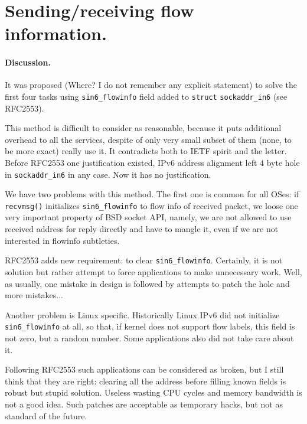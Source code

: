 \section{Sending/receiving flow information.}

\paragraph{Discussion.}
It was proposed (Where? I do not remember any explicit statement)
to solve the first four tasks using
\verb|sin6_flowinfo| field added to \verb|struct| \verb|sockaddr_in6|
(see RFC2553).

\begin{NB}
	This method is difficult to consider as reasonable, because it
	puts additional overhead to all the services, despite of only
	very small subset of them (none, to be more exact) really use it.
	It contradicts both to IETF spirit and the letter. Before RFC2553
	one justification existed, IPv6 address alignment left 4 byte
	hole in \verb|sockaddr_in6| in any case. Now it has no justification.
\end{NB}

We have two problems with this method. The first one is common for all OSes:
if \verb|recvmsg()| initializes \verb|sin6_flowinfo| to flow info
of received packet, we loose one very important property of BSD socket API,
namely, we are not allowed to use received address for reply directly
and have to mangle it, even if we are not interested in flowinfo subtleties.

\begin{NB}
	RFC2553 adds new requirement: to clear \verb|sin6_flowinfo|.
	Certainly, it is not solution but rather attempt to force applications
	to make unnecessary work. Well, as usually, one mistake in design
	is followed by attempts	to patch the hole and more mistakes...
\end{NB}

Another problem is Linux specific. Historically Linux IPv6 did not
initialize \verb|sin6_flowinfo| at all, so that, if kernel does not
support flow labels, this field is not zero, but a random number.
Some applications also did not take care about it.

\begin{NB}
Following RFC2553 such applications can be considered as broken,
but I still think that they are right: clearing all the address
before filling known fields is robust but stupid solution.
Useless wasting CPU cycles and
memory bandwidth is not a good idea. Such patches are acceptable
as temporary hacks, but not as standard of the future.
\end{NB}


